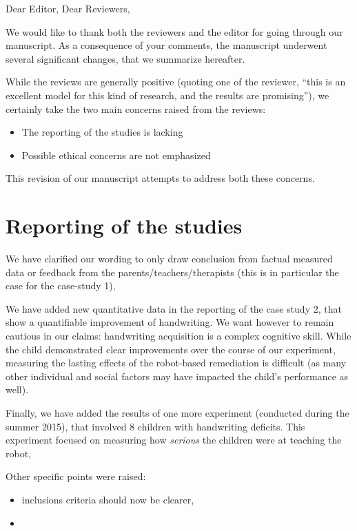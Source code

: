 \documentclass{article}
\begin{document}
Dear Editor, Dear Reviewers,

\vspace{2em}

We would like to thank both the reviewers and the editor for going through our
manuscript. As a consequence of your comments, the manuscript underwent
several significant changes, that we summarize hereafter.

While the reviews are generally positive (quoting one of the reviewer, ``this
is an excellent model for this kind of research, and the results are
promising''), we certainly take the two main concerns raised from the reviews:

\begin{itemize}
    \item The reporting of the studies is lacking
    \item Possible ethical concerns are not emphasized
\end{itemize}

This revision of our manuscript attempts to address both these concerns.

\section*{Reporting of the studies}

We have clarified our wording to only draw conclusion from factual measured
data or feedback from the parents/teachers/therapists (this is in particular
the case for the case-study 1),

We have added new quantitative data in the reporting of the case study 2, that
show a quantifiable improvement of handwriting. We want however to remain
cautious in our claims: handwriting acquisition is a complex cognitive skill.
While the child demonstrated clear improvements over the course of our
experiment, measuring the lasting effects of the robot-based remediation is
difficult (as many other individual and social factors may have impacted the
child's performance as well).

Finally, we have added the results of one more experiment (conducted during the
summer 2015), that involved 8 children with handwriting deficits. This
experiment focused on measuring how \emph{serious} the children were at
teaching the robot,

Other specific points were raised:

\begin{itemize}
    \item inclusions criteria should now be clearer,
    \item 

\end{itemize}
\end{document}
